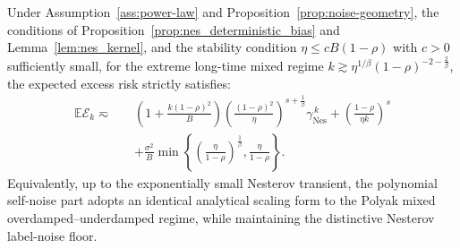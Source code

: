 \begin{theorem}
\label{thm:nes_two_sided_scaling}
Under Assumption~\ref{ass:power-law} and Proposition~\ref{prop:noise-geometry}, the conditions of Proposition~\ref{prop:nes_deterministic_bias} and Lemma~\ref{lem:nes_kernel}, and the stability condition \(\eta\le cB(1-\rho)\) with \(c>0\) sufficiently small, for the extreme long-time mixed regime $k \gtrsim \eta^{1/\beta}(1-\rho)^{-2-\frac{2}{\beta}}$, the expected excess risk strictly satisfies:
\begin{align*}
    \mathbb{E}\mathcal E_k \eqsim\quad
    &\left( 1 + \frac{k(1-\rho)^2}{B} \right) \left(\frac{(1-\rho)^2}{\eta}\right)^{s+\frac{1}{\beta}} \gamma_{\mathrm{Nes}}^{\,k} 
    + \left(\frac{1-\rho}{\eta k}\right)^s \\
    &+ \frac{\sigma^2}{B} \min\left\{ \left(\frac{\eta}{1-\rho}\right)^{\frac1\beta}, \frac{\eta}{1-\rho} \right\}.
\end{align*}
Equivalently, up to the exponentially small Nesterov transient, the polynomial self-noise part adopts an identical analytical scaling form to the Polyak mixed overdamped--underdamped regime, while maintaining the distinctive Nesterov label-noise floor.
\end{theorem}

